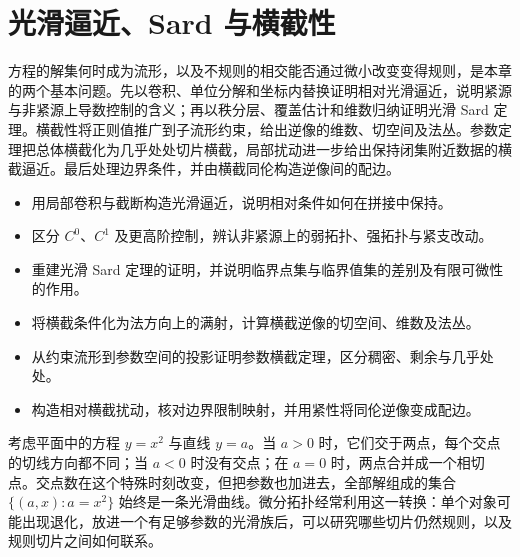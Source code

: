 
% 
% 

\chapter{光滑逼近、Sard 与横截性}
\label{g2:ch:14}

\begin{chapterabstract}
	方程的解集何时成为流形，以及不规则的相交能否通过微小改变变得规则，是本章的两个基本问题。先以卷积、单位分解和坐标内替换证明相对光滑逼近，说明紧源与非紧源上导数控制的含义；再以秩分层、覆盖估计和维数归纳证明光滑 Sard 定理。横截性将正则值推广到子流形约束，给出逆像的维数、切空间及法丛。参数定理把总体横截化为几乎处处切片横截，局部扰动进一步给出保持闭集附近数据的横截逼近。最后处理边界条件，并由横截同伦构造逆像间的配边。
\end{chapterabstract}

\begin{learninggoals}
	\begin{itemize}
		\item 用局部卷积与截断构造光滑逼近，说明相对条件如何在拼接中保持。
		\item 区分 \(C^0\)、\(C^1\) 及更高阶控制，辨认非紧源上的弱拓扑、强拓扑与紧支改动。
		\item 重建光滑 Sard 定理的证明，并说明临界点集与临界值集的差别及有限可微性的作用。
		\item 将横截条件化为法方向上的满射，计算横截逆像的切空间、维数及法丛。
		\item 从约束流形到参数空间的投影证明参数横截定理，区分稠密、剩余与几乎处处。
		\item 构造相对横截扰动，核对边界限制映射，并用紧性将同伦逆像变成配边。
	\end{itemize}
\end{learninggoals}

考虑平面中的方程 \(y=x^2\) 与直线 \(y=a\)。当 \(a>0\) 时，它们交于两点，每个交点的切线方向都不同；当 \(a<0\) 时没有交点；在 \(a=0\) 时，两点合并成一个相切点。交点数在这个特殊时刻改变，但把参数也加进去，全部解组成的集合 \(\{(a,x):a=x^2\}\) 始终是一条光滑曲线。微分拓扑经常利用这一转换：单个对象可能出现退化，放进一个有足够参数的光滑族后，可以研究哪些切片仍然规则，以及规则切片之间如何联系。

